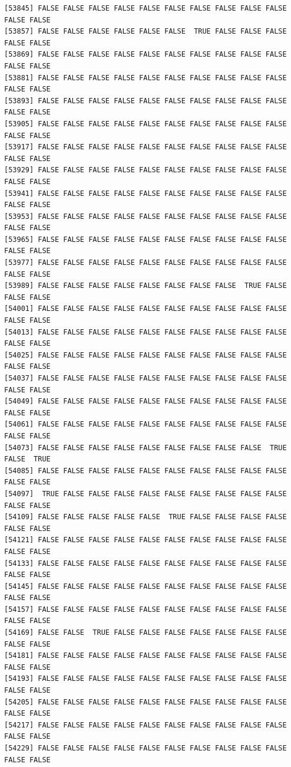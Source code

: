 \documentclass[
  a4paper,
  DIV=11,
  numbers=noendperiod]{scrartcl}
\begin{document}
\begin{verbatim}
[53845] FALSE FALSE FALSE FALSE FALSE FALSE FALSE FALSE FALSE FALSE FALSE FALSE
[53857] FALSE FALSE FALSE FALSE FALSE FALSE  TRUE FALSE FALSE FALSE FALSE FALSE
[53869] FALSE FALSE FALSE FALSE FALSE FALSE FALSE FALSE FALSE FALSE FALSE FALSE
[53881] FALSE FALSE FALSE FALSE FALSE FALSE FALSE FALSE FALSE FALSE FALSE FALSE
[53893] FALSE FALSE FALSE FALSE FALSE FALSE FALSE FALSE FALSE FALSE FALSE FALSE
[53905] FALSE FALSE FALSE FALSE FALSE FALSE FALSE FALSE FALSE FALSE FALSE FALSE
[53917] FALSE FALSE FALSE FALSE FALSE FALSE FALSE FALSE FALSE FALSE FALSE FALSE
[53929] FALSE FALSE FALSE FALSE FALSE FALSE FALSE FALSE FALSE FALSE FALSE FALSE
[53941] FALSE FALSE FALSE FALSE FALSE FALSE FALSE FALSE FALSE FALSE FALSE FALSE
[53953] FALSE FALSE FALSE FALSE FALSE FALSE FALSE FALSE FALSE FALSE FALSE FALSE
[53965] FALSE FALSE FALSE FALSE FALSE FALSE FALSE FALSE FALSE FALSE FALSE FALSE
[53977] FALSE FALSE FALSE FALSE FALSE FALSE FALSE FALSE FALSE FALSE FALSE FALSE
[53989] FALSE FALSE FALSE FALSE FALSE FALSE FALSE FALSE  TRUE FALSE FALSE FALSE
[54001] FALSE FALSE FALSE FALSE FALSE FALSE FALSE FALSE FALSE FALSE FALSE FALSE
[54013] FALSE FALSE FALSE FALSE FALSE FALSE FALSE FALSE FALSE FALSE FALSE FALSE
[54025] FALSE FALSE FALSE FALSE FALSE FALSE FALSE FALSE FALSE FALSE FALSE FALSE
[54037] FALSE FALSE FALSE FALSE FALSE FALSE FALSE FALSE FALSE FALSE FALSE FALSE
[54049] FALSE FALSE FALSE FALSE FALSE FALSE FALSE FALSE FALSE FALSE FALSE FALSE
[54061] FALSE FALSE FALSE FALSE FALSE FALSE FALSE FALSE FALSE FALSE FALSE FALSE
[54073] FALSE FALSE FALSE FALSE FALSE FALSE FALSE FALSE FALSE  TRUE FALSE  TRUE
[54085] FALSE FALSE FALSE FALSE FALSE FALSE FALSE FALSE FALSE FALSE FALSE FALSE
[54097]  TRUE FALSE FALSE FALSE FALSE FALSE FALSE FALSE FALSE FALSE FALSE FALSE
[54109] FALSE FALSE FALSE FALSE FALSE  TRUE FALSE FALSE FALSE FALSE FALSE FALSE
[54121] FALSE FALSE FALSE FALSE FALSE FALSE FALSE FALSE FALSE FALSE FALSE FALSE
[54133] FALSE FALSE FALSE FALSE FALSE FALSE FALSE FALSE FALSE FALSE FALSE FALSE
[54145] FALSE FALSE FALSE FALSE FALSE FALSE FALSE FALSE FALSE FALSE FALSE FALSE
[54157] FALSE FALSE FALSE FALSE FALSE FALSE FALSE FALSE FALSE FALSE FALSE FALSE
[54169] FALSE FALSE  TRUE FALSE FALSE FALSE FALSE FALSE FALSE FALSE FALSE FALSE
[54181] FALSE FALSE FALSE FALSE FALSE FALSE FALSE FALSE FALSE FALSE FALSE FALSE
[54193] FALSE FALSE FALSE FALSE FALSE FALSE FALSE FALSE FALSE FALSE FALSE FALSE
[54205] FALSE FALSE FALSE FALSE FALSE FALSE FALSE FALSE FALSE FALSE FALSE FALSE
[54217] FALSE FALSE FALSE FALSE FALSE FALSE FALSE FALSE FALSE FALSE FALSE FALSE
[54229] FALSE FALSE FALSE FALSE FALSE FALSE FALSE FALSE FALSE FALSE FALSE FALSE

\end{verbatim}
\end{document}
